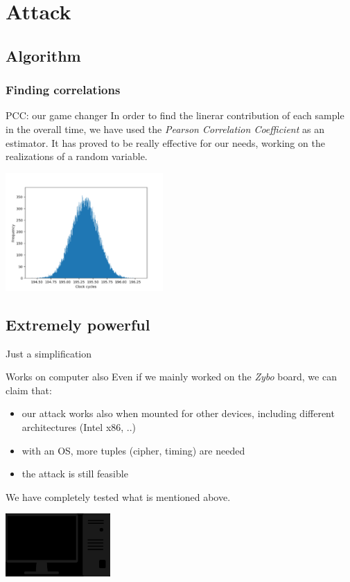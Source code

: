 \documentclass{beamer}
\begin{document}
\section{Attack}
\subsection{Algorithm}
\begin{frame}[fragile]
	\frametitle{Finding correlations}
	\begin{block}{PCC: our game changer}
		In order to find the linerar contribution of each sample in the overall time, we have used the \textit{Pearson Correlation Coefficient} as an estimator. It has proved to be really effective for our needs, working on the realizations of a random variable.
	\end{block}
	\begin{center}
		\includegraphics[width=6cm]{./graphics/rand_distr}
	\end{center}
\end{frame}

\subsection{Extremely powerful}
\begin{frame}{Just a simplification}
	\begin{block}{Works on computer also}
		Even if we mainly worked on the \textit{Zybo} board, we can claim that:
		\begin{itemize}
			\item our attack works also when mounted for other devices, including different architectures (Intel x86, ..)
			\item with an  OS, more tuples (cipher, timing) are needed
			\item the attack is still feasible
		\end{itemize}
    We have completely tested what is mentioned above.
    \begin{center}
      \includegraphics[width=4cm]{./graphics/pc}
    \end{center}
	\end{block}
\end{frame}
\end{document}
